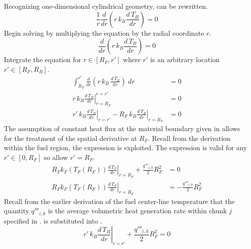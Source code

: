       Recognizing one-dimensional cylindrical geometry,  can 
      be rewritten.
      \begin{equation}
        \label{eq:tb_heat_conduction}
        \frac{1}{r} \frac{d}{dr} \left( r \, k_B \frac{d \, T_B}{dr} \right) = 0
      \end{equation}
      Begin solving  by multiplying the equation by
      the radial coordinate $r$.
      \begin{equation}
        \frac{d}{dr} \left( r \, k_B \frac{d \, T_B}{dr} \right) = 0
      \end{equation}
      Integrate the equation for $r \in[R_F,r']$ where $r'$ is an arbitrary
      location $r' \in [R_F,R_B]$.
      \begin{align}
        \int_{R_F}^{r'} \frac{d}{dr} \left( r\, k_B \, 
          \frac{d\,T_B}{dr} \right) \; dr &= 0\\
        \left. r\, k_B \frac{d\,T_B}{dr} \right|_{r=R_F}^{r=r'} &= 0 \\
        \label{eq:tf_first_integral}
        \left. r' \, k_B \frac{d\,T_B}{dr} \right|_{r=r'} - 
          \left. R_F \, k_B \frac{d\,T_B}{dr} \right|_{r=R_F} &= 0
      \end{align}
      The assumption of constant heat flux at the material boundary given in 
       allows for the treatment of the spatial 
      derivative at $R_F$. Recall from the derivation within the fuel region, 
      the expression  is exploited. The expression is valid 
      for any $r' \in [0,R_F]$ so allow $r'=R_F$.
      \begin{align}
        \left. R_F k_F(T_F(R_F)) \frac{d\,T_F}{dr} \right|_{r=R_F} + 
          \frac{q'''_{i,k}}{2} R_F^2 &= 0 \\
        \label{eq:surface_relation}
        \left. R_F k_F(T_F(R_F)) \frac{d\,T_F}{dr} \right|_{r=R_F} &= 
          - \frac{q'''_{i,k}}{2} R_F^2
      \end{align}
      Recall from the earlier derivation of the fuel center-line temperature 
      that the quantity $q'''_{i,k}$ is the average volumetric heat generation 
      rate within chunk $j$ specified in .
       is substituted into
      .
      \begin{equation}
        \label{eq:tf_first_bc}
        \left. r' \, k_B \frac{d\,T_B}{dr} \right|_{r=r'} +
          \frac{q'''_{i,k}}{2} R_F^2 = 0
      \end{equation}

